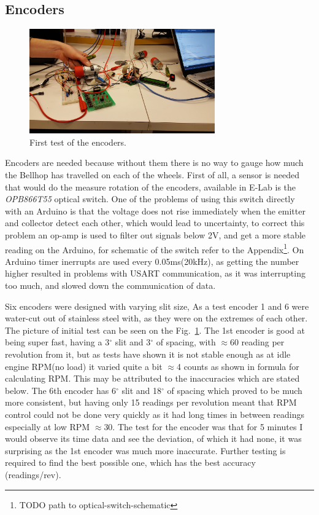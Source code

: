 \documentclass[11pt]{article}
\begin{document}
\subsection*{Encoders}

\begin{figure}
  \includegraphics[width=8cm]{encoders.jpg}
  \caption{First test of the encoders.}
  \label{encoder-test}
\end{figure}


Encoders are needed because without them there is no way to gauge how much the Bellhop has travelled on each of the wheels. First of all, a sensor is needed that would do the measure rotation of the encoders, available in E-Lab is the \textit{OPB866T55} optical switch. One of the problems of using this switch directly with an Arduino is that the voltage does not rise immediately when the emitter and collector detect each other, which would lead to uncertainty, to correct this problem an op-amp is used to filter out signals below 2V, and get a more stable reading on the Arduino, for schematic of the switch refer to the Appendix\footnote{TODO path to optical-switch-schematic}. On Arduino timer inerrupts are used every 0.05ms(20kHz), as getting the number higher resulted in problems with USART communication, as it was interrupting too much, and slowed down the communication of data.



Six encoders were designed with varying slit size, As a test encoder 1 and 6 were water-cut out of stainless steel with, as they were on the extremes of each other. The picture of initial test can be seen on the Fig.~\ref{encoder-test}. The 1st encoder is good at being super fast, having a 3$^\circ$ slit and 3$^\circ$ of spacing, with $\approx$60 reading per revolution from it, but as tests have shown it is not stable enough as at idle engine RPM(no load) it varied quite a bit $\approx$4 counts as shown in formula for calculating RPM. This may be attributed to the inaccuracies which are stated below. The 6th encoder has 6$^\circ$ slit and 18$^\circ$ of spacing which proved to be much more consistent, but having only 15 readings per revolution meant that RPM control could not be done very quickly as it had long times in between readings especially at low RPM $\approx$30. The test for the encoder was that for 5 minutes I would observe its time data and see the deviation, of which it had none, it was surprising as the 1st encoder was much more inaccurate. Further testing is required to find the best possible one, which has the best accuracy (readings/rev).
\end{document}
